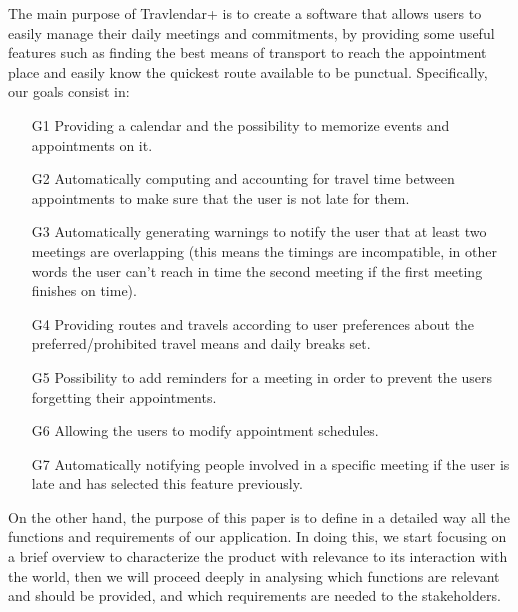 The main purpose of Travlendar+ is to create a software that allows users to easily manage their daily meetings and commitments, by providing some useful features such as finding the best means of transport to reach the appointment place and easily know the quickest route available to be punctual.
Specifically, our goals consist in:
\begin{itemize}

\item[G1] Providing a calendar and the possibility to memorize events and appointments on it.

\item[G2] Automatically computing and accounting for travel time between appointments to make sure that the user is not late for them.


\item[G3] Automatically generating warnings to notify the user that at least two meetings are overlapping (this means the timings are incompatible, in other words the user can't reach in time the second meeting if the first meeting finishes on time).

\item[G4] Providing routes and travels according to user preferences about the preferred/prohibited travel means and daily breaks set.

\item[G5] Possibility to add reminders for a meeting in order to prevent the users forgetting their appointments.

\item[G6] Allowing the users to modify appointment schedules.

\item[G7] Automatically notifying people involved in a specific meeting if the user is late and has selected this feature previously. 


\end{itemize}

On the other hand, the purpose of this paper is to define in a detailed way all the functions and requirements of our application. In doing this, we start focusing on a brief overview to characterize the product with relevance to its interaction with the world, then we will proceed deeply in analysing which functions are relevant and should be provided, and which requirements are needed to the stakeholders. 
